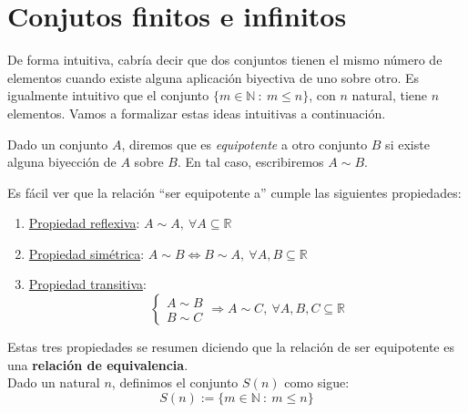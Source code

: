 
\section{Conjutos finitos e infinitos}
De forma intuitiva, cabría decir que dos conjuntos tienen el mismo número de elementos cuando
existe alguna aplicación biyectiva de uno sobre otro. Es igualmente intuitivo que el conjunto
$\{m \in \mathbb{N}~:~m \leq n\}$, con $n$ natural, tiene $n$ elementos. Vamos a formalizar estas
ideas intuitivas a continuación.

\begin{definicion}
    Dado un conjunto $A$, diremos que es \emph{equipotente} a otro conjunto $B$ si existe alguna biyección de $A$ sobre $B$. En tal caso, escribiremos $A \sim B$.
\end{definicion}

Es fácil ver que la relación ``ser equipotente a'' cumple las siguientes propiedades:
\begin{enumerate}
    \item \underline{Propiedad reflexiva}: $A \sim A, ~\forall A \subseteq \mathbb{R}$
    
    \item \underline{Propiedad simétrica}: $A \sim B \Longleftrightarrow B \sim A,~ \forall A,B \subseteq \mathbb{R}$
    
    \item \underline{Propiedad transitiva}:
    \begin{equation*}
        \left\{ \begin{array}{lcc}
            A \sim B \\
            B \sim C
            \end{array}
        \right.
        \Longrightarrow A \sim C, ~\forall A,B,C \subseteq \mathbb{R}
    \end{equation*}
\end{enumerate}

Estas tres propiedades se resumen diciendo que la relación de ser equipotente es una \textbf{relación de equivalencia}.\\

Dado un natural $n$, definimos el conjunto $S(n)$ como sigue:
\begin{equation*}
    S(n):=\{m \in \mathbb{N}~:~ m \leq n\}
\end{equation*}

